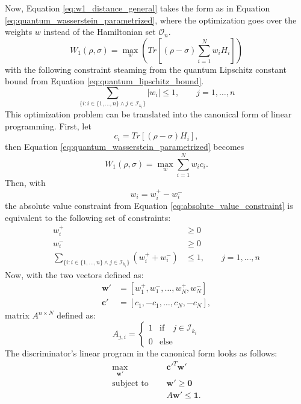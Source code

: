 Now, Equation \eqref{eq:w1_distance_general} takes the form as in Equation
\eqref{eq:quantum_wasserstein_parametrized}, where the optimization goes over the
weights $w$ instead of the Hamiltonian set $\mathcal{O}_n$.
\begin{equation}
  \label{eq:quantum_wasserstein_parametrized}
  W_1(\rho, \sigma) = \max_{w}{(Tr[(\rho - \sigma)\sum_{i=1}^N w_iH_i])}
\end{equation}
with the following constraint steaming from the quantum Lipschitz constant bound
from Equation \eqref{eq:quantum_lipschitz_bound}.
\begin{equation}
  \label{eq:absolute_value_constraint}
\sum_{\{i: i \in \{1,\ldots, n\} \land j \in \mathcal{I}_{k_i} \}} |w_i| \leq 1, \qquad j=1,\ldots,n
\end{equation}
This optimization problem can be translated into the canonical form of linear
programming. First, let
\begin{equation}
  c_i=Tr[(\rho - \sigma)H_i],
\end{equation}  
  then Equation \eqref{eq:quantum_wasserstein_parametrized} becomes
\begin{equation}
  W_1(\rho, \sigma) = \max_{w}{\sum_{i=1}^N w_ic_i}.
\end{equation}  
Then, with
\begin{equation}
    w_i = w_i^+ - w_i^-
\end{equation}
the absolute value constraint from Equation \eqref{eq:absolute_value_constraint} is equivalent to the following set of
constraints: 
\begin{equation}
\begin{split}
  w_i^+ &\ge 0 \\
  w_i^- &\ge 0 \\
  \sum_{\{i: i \in \{1,\ldots, n\} \land j \in \mathcal{I}_{k_i} \}} (w_i^+ + w_i^-) &\leq 1, \qquad j=1,\ldots,n
\end{split}
\end{equation}
Now, with the two vectors defined as:
\begin{equation}
\begin{split}
\bm{w'} &= [w_1^+, w_1^-, \ldots, w_N^+, w_N^-] \\
\bm{c'} &= [c_1, -c_1, \ldots, c_N, -c_N],
\end{split}
\end{equation}
matrix $A^{n \times N}$ defined as:
\[A_{j, i}  = \begin{cases} 
    1 & \text{if} \quad j \in \mathcal{I}_{k_i} \\
    0 & \text{else}
  \end{cases}
\]
The discriminator's linear program in the canonical form looks as follows:
\begin{equation}
\begin{split}
  \max_{\bm{w'}}{} \quad & \bm{c'}^T \bm{w'}\\
  \text{subject to } \quad & \bm{w'} \geq \bm{0} \\
  & A\bm{w'} \leq \bm{1}.
\end{split}
\end{equation}

